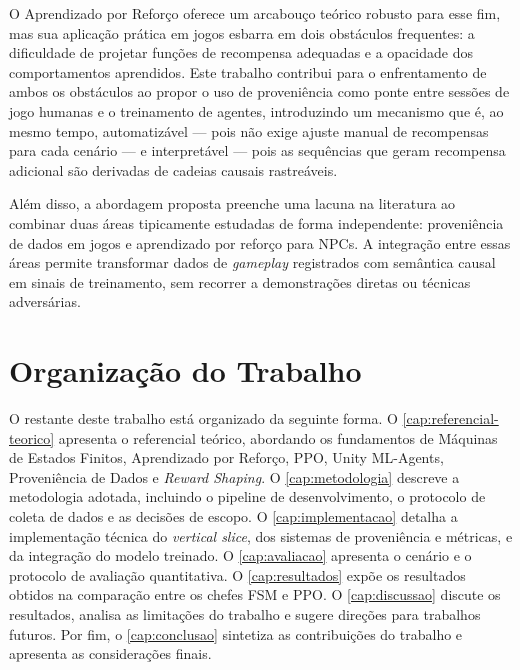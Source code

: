 O Aprendizado por Reforço oferece um arcabouço teórico robusto para esse fim,
mas sua aplicação prática em jogos esbarra em dois obstáculos frequentes: a
dificuldade de projetar funções de recompensa adequadas e a opacidade dos
comportamentos aprendidos. Este trabalho contribui para o enfrentamento de
ambos os obstáculos ao propor o uso de proveniência como ponte entre sessões
de jogo humanas e o treinamento de agentes, introduzindo um mecanismo que é,
ao mesmo tempo, automatizável --- pois não exige ajuste manual de recompensas
para cada cenário --- e interpretável --- pois as sequências que geram
recompensa adicional são derivadas de cadeias causais rastreáveis.

Além disso, a abordagem proposta preenche uma lacuna na literatura ao combinar
duas áreas tipicamente estudadas de forma independente: proveniência de dados
em jogos e aprendizado por reforço para NPCs. A integração entre essas áreas
permite transformar dados de \textit{gameplay} registrados com semântica
causal em sinais de treinamento, sem recorrer a demonstrações diretas ou
técnicas adversárias.

\section{Organização do Trabalho}
\label{sec:organizacao}

O restante deste trabalho está organizado da seguinte forma. O
\autoref{cap:referencial-teorico} apresenta o referencial teórico, abordando
os fundamentos de Máquinas de Estados Finitos, Aprendizado por Reforço, PPO,
Unity ML-Agents, Proveniência de Dados e \textit{Reward Shaping}. O
\autoref{cap:metodologia} descreve a metodologia adotada, incluindo o
pipeline de desenvolvimento, o protocolo de coleta de dados e as decisões de
escopo. O \autoref{cap:implementacao} detalha a implementação técnica do
\textit{vertical slice}, dos sistemas de proveniência e métricas, e da
integração do modelo treinado. O \autoref{cap:avaliacao} apresenta o cenário e
o protocolo de avaliação quantitativa. O \autoref{cap:resultados} expõe os
resultados obtidos na comparação entre os chefes FSM e PPO. O
\autoref{cap:discussao} discute os resultados, analisa as limitações do
trabalho e sugere direções para trabalhos futuros. Por fim, o
\autoref{cap:conclusao} sintetiza as contribuições do trabalho e apresenta as
considerações finais.
